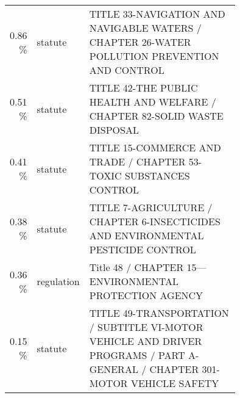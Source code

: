 \begin{tabular}{rlp{0.75\linewidth}}
    0.86 \%	    &statute	&TITLE 33-NAVIGATION AND NAVIGABLE WATERS / CHAPTER 26-WATER POLLUTION PREVENTION AND CONTROL\\
    0.51 \%	    &statute	&TITLE 42-THE PUBLIC HEALTH AND WELFARE / CHAPTER 82-SOLID WASTE DISPOSAL\\
    0.41 \%	    &statute	&TITLE 15-COMMERCE AND TRADE / CHAPTER 53-TOXIC SUBSTANCES CONTROL\\
    0.38 \%	    &statute	&TITLE 7-AGRICULTURE / CHAPTER 6-INSECTICIDES AND ENVIRONMENTAL PESTICIDE CONTROL\\
    0.36 \%	    &regulation	&Title 48 / CHAPTER 15—ENVIRONMENTAL PROTECTION AGENCY\\
    0.15 \%	    &statute	&TITLE 49-TRANSPORTATION / SUBTITLE VI-MOTOR VEHICLE AND DRIVER PROGRAMS / PART A-GENERAL / CHAPTER 301-MOTOR VEHICLE SAFETY\\
    \bottomrule
\end{tabular}
